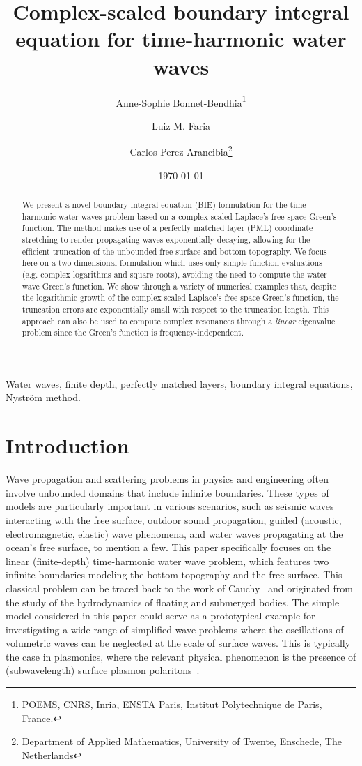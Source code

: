 \documentclass[review,hidelinks,onefignum,onetabnum]{siamart220329}
\title{Complex-scaled boundary integral equation for time-harmonic water waves}
\author{Anne-Sophie Bonnet-Bendhia\thanks{POEMS, CNRS, Inria, ENSTA Paris, Institut Polytechnique de Paris,  France.}
\and Luiz M. Faria\footnotemark[1]
\and Carlos Perez-Arancibia\thanks{Department of Applied Mathematics, University
of Twente, Enschede,  The Netherlands}
}
\date{\today}
\begin{document}
\maketitle

\begin{abstract}  
  We present a novel boundary integral equation (BIE) formulation for the
  time-harmonic water-waves problem based on a complex-scaled Laplace's
  free-space Green's function. The method makes use of a perfectly matched layer
  (PML) coordinate stretching to render propagating waves exponentially
  decaying, allowing for the efficient truncation of the unbounded free surface and bottom topography. We focus here on a two-dimensional 
 formulation which uses only simple function evaluations (e.g. complex logarithms
  and square roots), avoiding the need to compute the water-wave Green's
  function. We show through a variety of numerical examples that, despite the logarithmic growth of the complex-scaled Laplace's
  free-space Green's function, the truncation
  errors are exponentially small with respect to the truncation length. This approach can also be used to compute complex resonances through a \emph{linear} eigenvalue problem since the Green's function is frequency-independent. 
\end{abstract}

\begin{keywords}
    Water waves, finite depth, perfectly matched layers, boundary integral equations, Nystr\"om method. 
\end{keywords}



\section{Introduction}

Wave propagation and scattering problems in physics and engineering often involve unbounded domains that include infinite boundaries. These types of models are particularly important in various scenarios, such as seismic waves interacting with the free surface, outdoor sound propagation, guided (acoustic, electromagnetic, elastic) wave phenomena, and water waves propagating at the ocean's free surface, to mention a few. This paper specifically focuses on the linear (finite-depth) time-harmonic water wave problem, which features two infinite boundaries modeling the bottom topography and the free surface. 
This classical problem can be traced back to the work of Cauchy~\cite{cauchy1816theory} and originated from the study of the hydrodynamics of floating and submerged bodies. The simple model considered in this paper could serve as a prototypical example for investigating a wide range of simplified wave problems where the oscillations of volumetric waves can be neglected at the scale of surface waves. This is typically the case in plasmonics, where the relevant physical phenomenon is the presence of (subwavelength) surface plasmon polaritons~\cite{maier2007plasmonics}.
\end{document}
